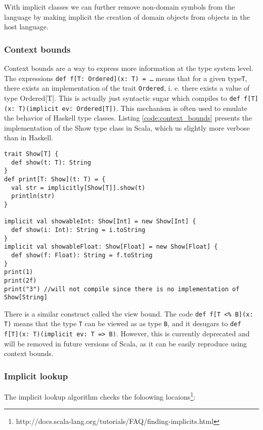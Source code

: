 With implicit classes we can further remove non-domain symbols from the language by making implicit the creation of domain objects from objects in the host language.

\subsubsection{Context bounds}
Context bounds are a way to express more information at the type system level. The expressions \texttt{def f[T: Ordered](x: T) = \ldots} means that for a given type\texttt{T}, there exists an implementation of the trait \texttt{Ordered}, i. e. there exists a value of type Ordered[T]. This is actually just syntactic sugar which compiles to \texttt{def f[T](x: T)(implicit ev: Ordered[T])}. This mechanism is often used to emulate the behavior of Haskell type classes. Listing \ref{code:context_bounds} presents the implementation of the Show type class in Scala, which us slightly more verbose than in Haskell.

\begin{lstlisting}[caption=Context bounds, label=code:context_bounds, float]
trait Show[T] {
  def show(t: T): String
}
def print[T: Show](t: T) = {
  val str = implicitly[Show[T]].show(t)
  println(str)
}

implicit val showableInt: Show[Int] = new Show[Int] {
  def show(i: Int): String = i.toString
}
implicit val showableFloat: Show[Float] = new Show[Float] {
  def show(f: Float): String = f.toString
}
print(1)
print(2f)
print("3") //will not compile since there is no implementation of Show[String]
\end{lstlisting}

There is a similar construct called the view bound. The code \texttt{def f[T <\% B](x: T)} means that the type \texttt{T} can be viewed as as type \texttt{B}, and it desugars to \texttt{def f[T](x: T)(implicit ev: T => B)}. However, this is currently deprecated and will be removed in future versions of Scala, as it can be easily reproduce using context bounds.

\subsubsection{Implicit lookup}

The implicit lookup algorithm checks the foloowing locaions\footnote{http://docs.scala-lang.org/tutorials/FAQ/finding-implicits.html}: 

